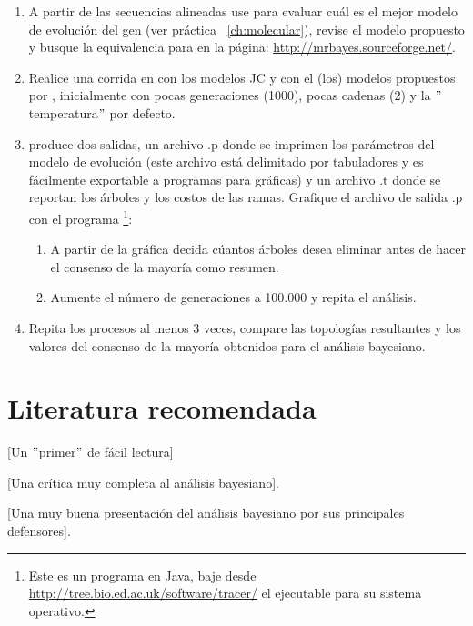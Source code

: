 \begin{enumerate} %

	\item A partir de las secuencias alineadas use  para evaluar cu\'al es el mejor modelo de evoluci\'on del gen (ver pr\'actica ~\ref{ch:molecular}), revise el modelo propuesto y busque la equivalencia para  en la p\'agina: \url{http://mrbayes.sourceforge.net/}.

	\item 	Realice una corrida en  con los modelos JC y con el (los) modelos propuestos por , inicialmente con pocas generaciones (1000), pocas cadenas (2) y la $"$temperatura$"$ por defecto.
	
	\item {} produce dos salidas, un archivo .p donde se imprimen los par\'ametros del modelo de evoluci\'on (este archivo est\'a delimitado por tabuladores y es f\'acilmente exportable a programas para gr\'aficas) y un archivo .t donde se reportan los \'arboles y los costos de las ramas. Grafique el archivo de salida .p con el programa \footnote{Este es un programa en Java, baje desde \url{http://tree.bio.ed.ac.uk/software/tracer/} el ejecutable para su sistema operativo.}:

	\begin{enumerate}
		\item A partir de la gr\'afica decida c\'uantos \'arboles desea eliminar antes de hacer el consenso de la mayor\'ia como resumen.


		\item Aumente el n\'umero de generaciones a 100.000 y repita el an\'alisis.
	\end{enumerate}	

	\item Repita los procesos al menos 3 veces, compare las topolog\'ias resultantes y los valores del consenso de la mayor\'ia obtenidos para el an\'alisis bayesiano.

\end{enumerate}







\section*{Literatura recomendada}

\cite{Archibald2003} [Un $"$primer$"$ de f\'acil lectura]

\cite{Goloboff2005} [Una cr\'itica muy completa al an\'alisis bayesiano].

\cite{HuelsenbeckRonquist2001} [Una muy buena presentaci\'on del an\'alisis bayesiano por sus principales defensores].
